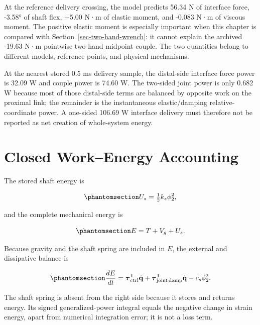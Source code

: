 \documentclass[
  letterpaper,
]{report}
\begin{document}
At the reference delivery crossing, the model predicts 56.34 N of
interface force, -3.58° of shaft flex, +5.00 N·m of elastic moment, and
-0.083 N·m of viscous moment. The positive elastic moment is especially
important when this chapter is compared with
Section~\ref{sec-two-hand-wrench}: it cannot explain the archived -19.63
N·m pointwise two-hand midpoint couple. The two quantities belong to
different models, reference points, and physical mechanisms.

At the nearest stored 0.5 ms delivery sample, the distal-side interface
force power is 32.09 W and couple power is 74.60 W. The two-sided joint
power is only 0.682 W because most of those distal-side terms are
balanced by opposite work on the proximal link; the remainder is the
instantaneous elastic/damping relative-coordinate power. A one-sided
106.69 W interface delivery must therefore not be reported as net
creation of whole-system energy.

\section{Closed Work--Energy Accounting}\label{sec-shaft-energy}

The stored shaft energy is

\begin{equation}\phantomsection\label{eq-shaft-strain-energy}{
U_s=\tfrac12 k_s\phi_2^2,
}\end{equation}

and the complete mechanical energy is

\begin{equation}\phantomsection\label{eq-shaft-total-energy}{
E=T+V_g+U_s.
}\end{equation}

Because gravity and the shaft spring are included in \(E\), the external
and dissipative balance is

\begin{equation}\phantomsection\label{eq-shaft-energy-rate}{
\frac{dE}{dt}
=\boldsymbol\tau_{\mathrm{ctrl}}^\mathsf T\dot{\mathbf q}
+\boldsymbol\tau_{\mathrm{joint\,damp}}^\mathsf T\dot{\mathbf q}
-c_s\dot\phi_2^2.
}\end{equation}

The shaft spring is absent from the right side because it stores and
returns energy. Its signed generalized-power integral equals the
negative change in strain energy, apart from numerical integration
error; it is not a loss term.
\end{document}
